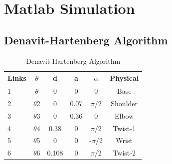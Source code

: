 \documentclass[11pt,a4paper, margin=1in]{report}
\begin{document}
\chapter{Matlab Simulation}
\section{Denavit-Hartenberg Algorithm}
\begin{table}[h]

	\centering
	\begin{tabular}{| l | c c c c c |}
		\hline
		Links 	& $\theta$ 		& d 	& a 	& $\alpha$	& Physical	\\ [0.5ex]
		\hline
		1 		& $\theta$ 		& 0 	& 0 	& 0 		& Base 		\\
		2 		& $\theta$2 	& 0 	& 0.07 	& $\pi$/2 	& Shoulder	\\
		3 		& $\theta$3 	& 0 	& 0.36 	& 0 		& Elbow		\\
		4 		& $\theta$4 	& 0.38 	& 0 	& $\pi$/2 	& Twist-1	\\
		5 		& $\theta$5 	& 0 	& 0 	& -$\pi$/2 	& Wrist		\\
		6 		& $\theta$6 	& 0.108 & 0 	& $\pi$/2 	& Twist-2	\\ [1ex]
		\hline
		
	\end{tabular}
		\caption{Denavit-Hartenberg Algorithm}
\end{table}
\end{document}

